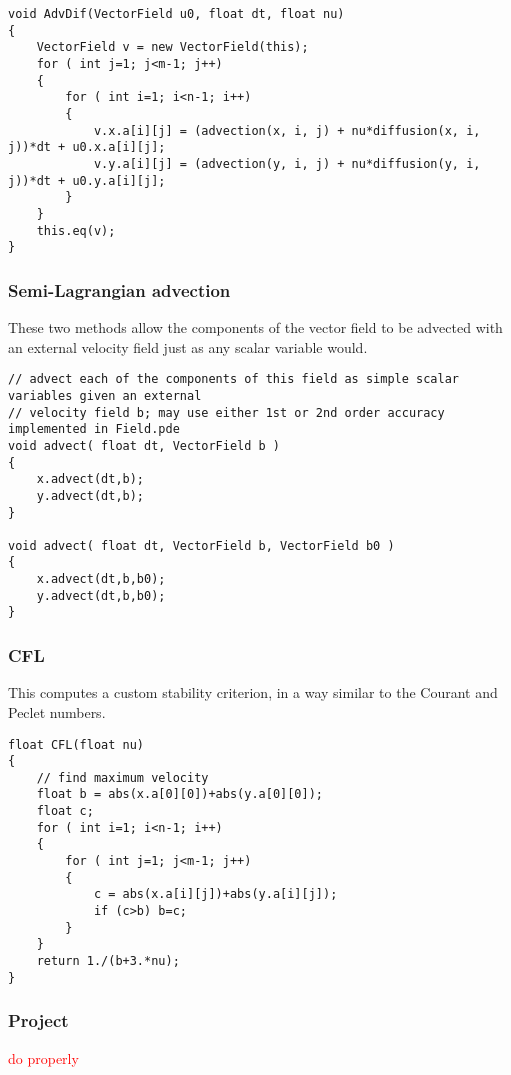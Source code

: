 \documentclass[notitlepage]{article}
\begin{document}
\begin{lstlisting}[style=myCpp]
void AdvDif(VectorField u0, float dt, float nu)
{
	VectorField v = new VectorField(this);
	for ( int j=1; j<m-1; j++)
	{
		for ( int i=1; i<n-1; i++)
		{
			v.x.a[i][j] = (advection(x, i, j) + nu*diffusion(x, i, j))*dt + u0.x.a[i][j];
			v.y.a[i][j] = (advection(y, i, j) + nu*diffusion(y, i, j))*dt + u0.y.a[i][j];
		}
	}
	this.eq(v);   
}
\end{lstlisting}

\subsubsection{Semi-Lagrangian advection}

These two methods allow the components of the vector field to be advected with an external velocity
field just as any scalar variable would.

\begin{lstlisting}[style=myCpp]
// advect each of the components of this field as simple scalar variables given an external
// velocity field b; may use either 1st or 2nd order accuracy implemented in Field.pde
void advect( float dt, VectorField b )
{
	x.advect(dt,b);
	y.advect(dt,b);
}

void advect( float dt, VectorField b, VectorField b0 )
{
	x.advect(dt,b,b0);
	y.advect(dt,b,b0);
}
\end{lstlisting}

\subsubsection{CFL}

This computes a custom stability criterion, in a way similar to the Courant and Peclet numbers.

\begin{lstlisting}[style=myCpp]
float CFL(float nu)
{
	// find maximum velocity
	float b = abs(x.a[0][0])+abs(y.a[0][0]);
	float c;
	for ( int i=1; i<n-1; i++)
	{
		for ( int j=1; j<m-1; j++)
		{ 
			c = abs(x.a[i][j])+abs(y.a[i][j]);
			if (c>b) b=c;
		}
	}
	return 1./(b+3.*nu);
}
\end{lstlisting}

\subsubsection{Project}

\textcolor{red}{do properly}
\end{document}
